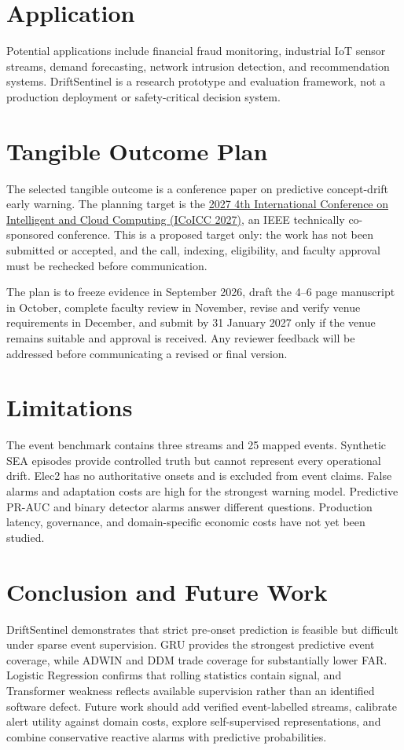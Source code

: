 \documentclass[10pt,twocolumn]{article}
\begin{document}
\section{Application}
Potential applications include financial fraud monitoring, industrial IoT sensor streams, demand forecasting, network intrusion detection, and recommendation systems. DriftSentinel is a research prototype and evaluation framework, not a production deployment or safety-critical decision system.

\section{Tangible Outcome Plan}
The selected tangible outcome is a conference paper on predictive concept-drift early warning. The planning target is the \href{https://icoicc.org.in/}{2027 4th International Conference on Intelligent and Cloud Computing (ICoICC 2027)}, an IEEE technically co-sponsored conference. This is a proposed target only: the work has not been submitted or accepted, and the call, indexing, eligibility, and faculty approval must be rechecked before communication.

The plan is to freeze evidence in September 2026, draft the 4--6 page manuscript in October, complete faculty review in November, revise and verify venue requirements in December, and submit by 31 January 2027 only if the venue remains suitable and approval is received. Any reviewer feedback will be addressed before communicating a revised or final version.

\section{Limitations}
The event benchmark contains three streams and 25 mapped events. Synthetic SEA episodes provide controlled truth but cannot represent every operational drift. Elec2 has no authoritative onsets and is excluded from event claims. False alarms and adaptation costs are high for the strongest warning model. Predictive PR-AUC and binary detector alarms answer different questions. Production latency, governance, and domain-specific economic costs have not yet been studied.

\section{Conclusion and Future Work}
DriftSentinel demonstrates that strict pre-onset prediction is feasible but difficult under sparse event supervision. GRU provides the strongest predictive event coverage, while ADWIN and DDM trade coverage for substantially lower FAR. Logistic Regression confirms that rolling statistics contain signal, and Transformer weakness reflects available supervision rather than an identified software defect. Future work should add verified event-labelled streams, calibrate alert utility against domain costs, explore self-supervised representations, and combine conservative reactive alarms with predictive probabilities.
\end{document}
